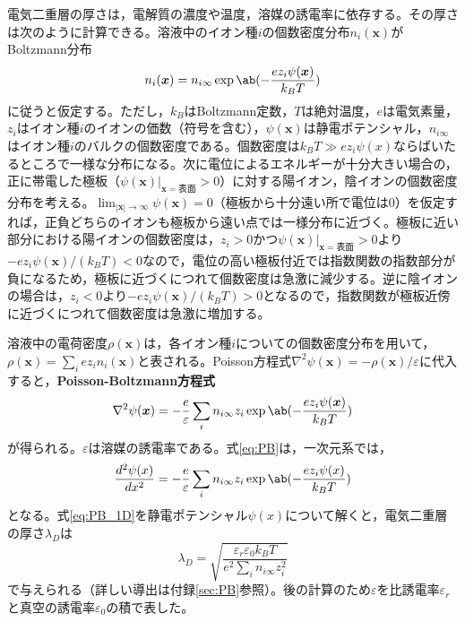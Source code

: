 \documentclass[autodetect-engine,dvi=dvipdfmx,a4paper,ja=standard,oneside,openany]{bxjsbook}
\begin{document}
電気二重層の厚さは，電解質の濃度や温度，溶媒の誘電率に依存する。その厚さは次のように計算できる\cite{足立泰久2013電気二重層とコロイド分散系の凝集}。溶液中のイオン種$i$の個数密度分布$n_i(\bm{x})$がBoltzmann分布
\begin{equation}
  n_i(\bm{x}) = n_{i\infty}\exp\ab(-\frac{ez_i\psi(\bm{x})}{k_BT})
  \label{eq:boltzmann}
\end{equation}
に従うと仮定する。ただし，$k_B$はBoltzmann定数，$T$は絶対温度，$e$は電気素量，$z_i$はイオン種$i$のイオンの価数（符号を含む），$\psi(\bm{x})$は静電ポテンシャル，$n_{i\infty}$はイオン種$i$のバルクの個数密度である。個数密度は$k_B T\gg ez_i\psi(x)$ならばいたるところで一様な分布になる。次に電位によるエネルギーが十分大きい場合の，正に帯電した極板（$\psi(\bm{x})|_{\bm{x}=\mathrm{表面}}>0$）に対する陽イオン，陰イオンの個数密度分布を考える。$\lim_{|\bm{x}|\to\infty}\psi(\bm{x})=0$（極板から十分遠い所で電位は0）を仮定すれば，正負どちらのイオンも極板から遠い点では一様分布に近づく。極板に近い部分における陽イオンの個数密度は，$z_i>0$かつ$\psi(\bm{x})|_{\bm{x}=\mathrm{表面}}>0$より$-ez_i\psi(\bm{x})/(k_BT)<0$なので，電位の高い極板付近では指数関数の指数部分が負になるため，極板に近づくにつれて個数密度は急激に減少する。逆に陰イオンの場合は，$z_i<0$より$-ez_i\psi(\bm{x})/(k_BT)>0$となるので，指数関数が極板近傍に近づくにつれて個数密度は急激に増加する。

溶液中の電荷密度$\rho(\bm{x})$は，各イオン種$i$についての個数密度分布を用いて，$\rho(\bm{x})=\sum_{i}ez_in_i(\bm{x})$と表される。Poisson方程式$\nabla^2\psi(\bm{x})=-\rho(\bm{x})/\varepsilon$に代入すると，\textbf{Poisson-Boltzmann方程式}
\begin{equation}
  \nabla^2\psi(\bm{x}) = -\frac{e}{\varepsilon}\sum_{i}n_{i\infty}z_i\exp\ab(-\frac{ez_i\psi(\bm{x})}{k_BT})
  \label{eq:PB}
\end{equation}
が得られる。$\varepsilon$は溶媒の誘電率である。式\eqref{eq:PB}は，一次元系では，
\begin{equation}
  \frac{d^2\psi(x)}{dx^2} = -\frac{e}{\varepsilon}\sum_{i}n_{i\infty}z_i\exp\ab(-\frac{ez_i\psi(x)}{k_BT})
  \label{eq:PB_1D}
\end{equation}
となる。式\eqref{eq:PB_1D}を静電ポテンシャル$\psi(x)$について解くと，電気二重層の厚さ$\lambda_D$は
\begin{equation}
  \lambda_D = \sqrt{\frac{\varepsilon_r\varepsilon_0 k_BT}{e^2\sum_{i}n_{i\infty}z_i^2}}\label{eq:debye_length}
\end{equation}
で与えられる（詳しい導出は付録\ref{sec:PB}参照）。後の計算のため$\varepsilon$を比誘電率$\varepsilon_r$と真空の誘電率$\varepsilon_0$の積で表した。
\end{document}
